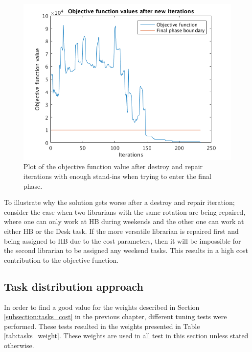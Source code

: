 \begin{figure}[!h]
	\centering
	\includegraphics[scale = 0.8]{Chapters/ImagesClaes/1phase1iterNoReRun.png}
	\caption{Plot of the objective function value after destroy and repair iterations with enough stand-ins when trying to enter the final phase.}
	\label{fig:feasibleNoRerun}
\end{figure}

To illustrate why the solution gets worse after a destroy and repair iteration; consider the case when two librarians with the same rotation are being repaired, where one can only work at HB during weekends and the other one can work at either HB or the Desk task. If the more versatile librarian is repaired first and being assigned to HB due to the cost parameters, then it will be impossible for the second librarian to be assigned any weekend tasks. This results in a high cost contribution to the objective function.

\subsection{Task distribution approach}\label{sec:task_dist_res}

In order to find a good value for the weights described in Section \ref{subsection:tasks_cost} in the previous chapter, different tuning tests were performed. These tests resulted in the weights presented in Table \ref{tab:tasks_weight}. These weights are used in all test in this section unless stated otherwise.

